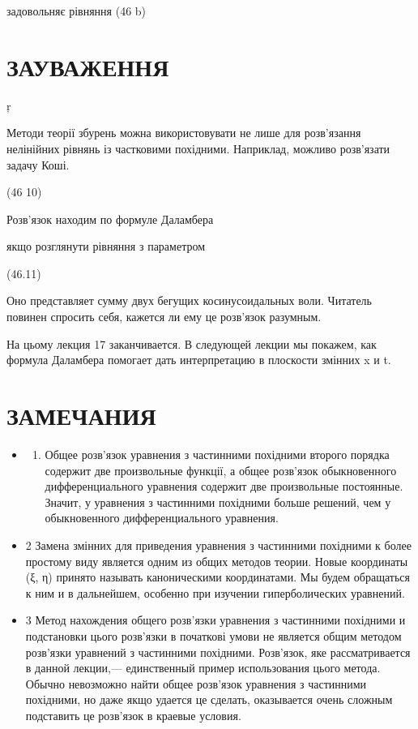 \documentclass[
  ukrainian,
]{article}
\providecommand{\tightlist}{%
  \setlength{\itemsep}{0pt}\setlength{\parskip}{0pt}}
\begin{document}
задовольняє рівняння (46 b)

\section{ЗАУВАЖЕННЯ}\label{ux437ux430ux443ux432ux430ux436ux435ux43dux43dux44f-6}

ŗ

Методи теорії збурень можна використовувати не лише для розв'язання
нелінійних рівнянь із частковими похідними. Наприклад, можливо
розв'язати задачу Коші.

(46 10)

Розв'язок находим по формуле Даламбера

якщо розглянути рівняння з параметром

(46.11)

Оно представляет сумму двух бегущих косинусоидальных воли. Читатель
повинен спросить себя, кажется ли ему це розв'язок разумным.

На цьому лекция 17 заканчивается. В следующей лекции мы покажем, как
формула Даламбера помогает дать интерпретацию в плоскости змінних x и t.

\section{ЗАМЕЧАНИЯ}\label{ux437ux430ux43cux435ux447ux430ux43dux438ux44f-2}

\begin{itemize}
\item
  \begin{enumerate}
  \def\labelenumi{\arabic{enumi}.}
  \tightlist
  \item
    Общее розв'язок уравнения з частинними похідними второго порядка
    содержит две произвольные функції, а общее розв'язок обыкновенного
    дифференциального уравнения содержит две произвольные постоянные.
    Значит, у уравнения з частинними похідними больше решений, чем у
    обыкновенного дифференциального уравнения.
  \end{enumerate}
\item
  2 Замена змінних для приведения уравнения з частинними похідними к
  более простому виду является одним из общих методов теории. Новые
  координаты (ξ, η) принято называть каноническими координатами. Мы
  будем обращаться к ним и в дальнейшем, особенно при изучении
  гиперболических уравнений.
\item
  3 Метод нахождения общего розв'язки уравнения з частинними похідними и
  подстановки цього розв'язки в початкові умови не является общим
  методом розв'язки уравнений з частинними похідними. Розв'язок, яке
  рассматривается в данной лекции,--- единственный пример использования
  цього метода. Обычно невозможно найти общее розв'язок уравнения з
  частинними похідними, но даже якщо удается це сделать, оказывается
  очень сложным подставить це розв'язок в краевые условия.
\end{itemize}
\end{document}
